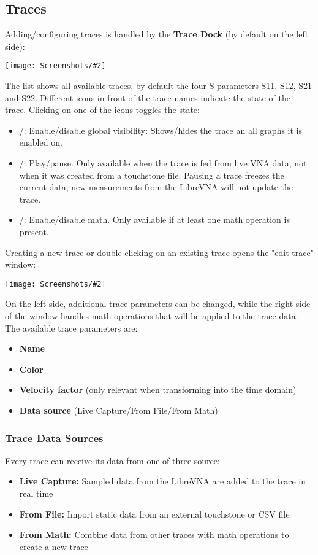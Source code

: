 \documentclass[a4paper,11pt]{article}
\newcommand{\vna}{LibreVNA}
\newcommand{\screenshot}[2]{\begin{center}
\texttt{[image: Screenshots/\#2]}
\end{center}}
\begin{document}
\subsection{Traces}
Adding/configuring traces is handled by the \textbf{Trace Dock} (by default on the left side): 
\screenshot{0.3}{TraceDock.png}
The list shows all available traces, by default the four S parameters S11, S12, S21 and S22. Different icons in front of the trace names indicate the state of the trace. Clicking on one of the icons toggles the state:
\begin{itemize}
\item /: Enable/disable global visibility: Shows/hides the trace an all graphs it is enabled on.
\item /: Play/pause. Only available when the trace is fed from live VNA data, not when it was created from a touchstone file. Pausing a trace freezes the current data, new measurements from the \vna{} will not update the trace.
\item /: Enable/disable math. Only available if at least one math operation is present.
\end{itemize}
\noindent
Creating a new trace or double clicking on an existing trace opens the "edit trace" window:
\screenshot{1.0}{TraceEdit.png}
On the left side, additional trace parameters can be changed, while the right side of the window handles math operations that will be applied to the trace data. The available trace parameters are:
\begin{itemize}
\item \textbf{Name}
\item \textbf{Color}
\item \textbf{Velocity factor} (only relevant when transforming into the time domain)
\item \textbf{Data source} (Live Capture/From File/From Math)
\end{itemize}

\subsubsection{Trace Data Sources}
Every trace can receive its data from one of three source:
\begin{itemize}
\item \textbf{Live Capture:} Sampled data from the LibreVNA are added to the trace in real time
\item \textbf{From File:} Import static data from an external touchstone or CSV file
\item \textbf{From Math:} Combine data from other traces with math operations to create a new trace
\end{itemize}
\end{document}
